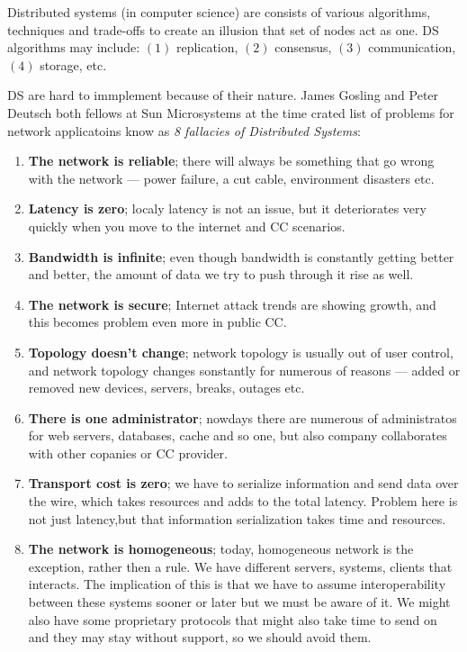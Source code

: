 Distributed systems (in computer science) are consists of various algorithms, techniques and trade-offs to create an illusion that set of nodes act as one. DS algorithms may include: $(1)$ replication, $(2)$ consensus, $(3)$ communication, $(4)$ storage, etc.

DS are hard to immplement because of their nature. James Gosling and Peter Deutsch both fellows at Sun Microsystems at the time crated list of problems for network applicatoins know as \textit{8 fallacies of Distributed Systems}:\label{enum:fallacies}

\begin{enumerate}[start=1,label={(\bfseries \arabic*)}]\label{ds:8_fallacies}
	\item \textbf{The network is reliable}; there will always be something that go wrong with the network --- power failure, a cut cable, environment disasters etc.
	\item \textbf{Latency is zero}; localy latency is not an issue, but it deteriorates very quickly when you move to the internet and CC scenarios.
	\item \textbf{Bandwidth is infinite}; even though bandwidth is constantly getting better and better, the amount of data we try to push through it rise as well.
	\item \textbf{The network is secure};  Internet attack trends are showing growth, and this becomes problem even more in public CC.
	\item \textbf{Topology doesn't change}; network topology is usually out of user control, and network topology changes sonstantly for numerous of reasons --- added or removed new devices, servers, breaks, outages etc.
	\item \textbf{There is one administrator}; nowdays there are numerous of administratos for web servers, databases, cache and so one, but also company collaborates with other copanies or CC provider.
	\item \textbf{Transport cost is zero}; we have to serialize information and send data over the wire, which takes resources and adds to the total latency. Problem here is not just latency,but that information serialization takes time and resources.
	\item \textbf{The network is homogeneous}; today, homogeneous network is the exception, rather then a rule. We have different servers, systems, clients that interacts. The implication of this is that we have to assume interoperability between these systems sooner or later but we must be aware of it. We might also have some  proprietary protocols that might also take time to send on and they may stay without support, so we should avoid them.
\end{enumerate}

